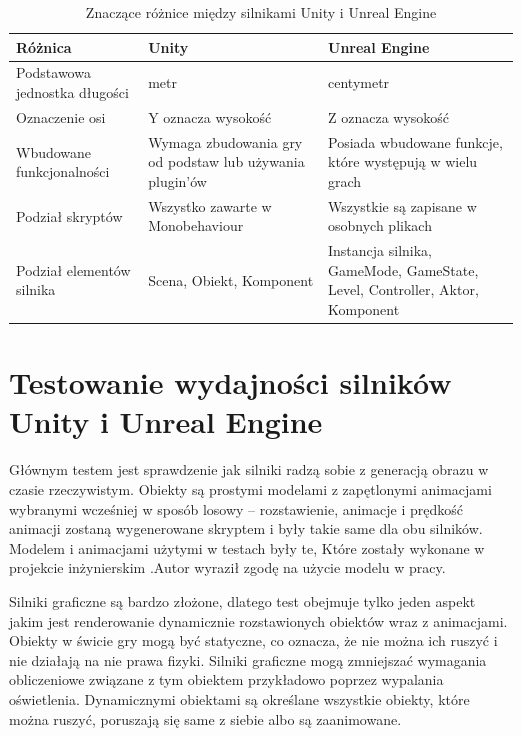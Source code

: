 \documentclass[12pt,twoside]{article}
\begin{document}
\begin{table}[ht]
\caption{Znaczące różnice między silnikami Unity i Unreal Engine}
\centering		
	\begin{tabular}{|p{3cm}|p{}|p{}|}	
		\hline
		Różnica & Unity & Unreal Engine  \\
		\hline
		Podstawowa jednostka długości & metr & centymetr \\
		\hline
		Oznaczenie osi & Y oznacza wysokość & Z oznacza wysokość \\
		\hline
		Wbudowane funkcjonalności & Wymaga zbudowania gry od podstaw lub
		używania plugin’ów & Posiada wbudowane funkcje, które występują w wielu
		grach \\
		\hline
        Podział skryptów & Wszystko zawarte w Monobehaviour & Wszystkie
        są zapisane w osobnych plikach \\
        \hline
        Podział elementów silnika & Scena, Obiekt, Komponent & Instancja
        silnika, GameMode, GameState, Level, Controller, Aktor, Komponent \\
        \hline
	\end{tabular}	
	
\label{Tabela:RozniceMiedzySIlnikami}
\end{table}	






\clearpage	
\section{Testowanie wydajności silników Unity i Unreal Engine}


Głównym testem jest sprawdzenie jak silniki radzą sobie z generacją obrazu w
czasie rzeczywistym. Obiekty są prostymi modelami z zapętlonymi animacjami
wybranymi wcześniej w sposób losowy – rozstawienie, animacje i prędkość animacji
zostaną wygenerowane skryptem i były takie same dla obu silników. Modelem i
animacjami użytymi w testach były te, Które zostały wykonane w projekcie
inżynierskim \cite{ModelSource}.Autor wyraził zgodę na użycie modelu w pracy.


Silniki graficzne są bardzo złożone, dlatego test obejmuje tylko jeden aspekt
jakim jest renderowanie dynamicznie rozstawionych obiektów wraz z animacjami.
Obiekty w świcie gry mogą być statyczne, co oznacza, że nie można ich ruszyć i
nie działają na nie prawa fizyki. Silniki graficzne mogą zmniejszać wymagania
obliczeniowe związane z tym obiektem przykładowo poprzez wypalania oświetlenia.
Dynamicznymi obiektami są określane wszystkie obiekty, które można ruszyć,
poruszają się same z siebie albo są zaanimowane. 
\end{document}
